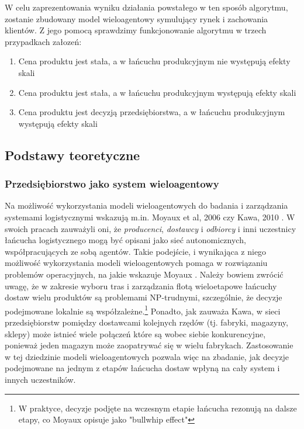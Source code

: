 \documentclass{article}
\begin{document}
W celu zaprezentowania wyniku działania powstałego w ten sposób algorytmu, zostanie zbudowany model wieloagentowy symulujący rynek i zachowania klientów. Z jego pomocą sprawdzimy funkcjonowanie algorytmu w trzech przypadkach załozeń: 

\begin{enumerate} 
	\item Cena produktu jest stała, a w łańcuchu produkcyjnym nie występują efekty skali 
	\item Cena produktu jest stała, a w łańcuchu produkcyjnym występują efekty skali
	\item Cena produktu jest decyzją przedsiębiorstwa, a w łańcuchu produkcyjnym występują efekty skali
\end{enumerate}


\subsection{Podstawy teoretyczne}
\subsubsection{Przedsiębiorstwo jako system wieloagentowy} 
Na możliwość wykorzystania modeli wieloagentowych do badania i zarządzania systemami logistycznymi wskazują m.in. Moyaux et al, 2006 \cite{Moyaux2006}  czy Kawa, 2010 \cite{Kawa2010}. W swoich pracach zauważyli oni, że  \textit{producenci},  \textit{dostawcy} i  \textit{odbiorcy} i inni uczestnicy łańcucha logistycznego mogą być opisani jako sieć autonomicznych, współpracujących ze sobą agentów. Takie podejście, i wynikająca z niego możliwość wykorzystania modeli wieloagentowych pomaga w rozwiązaniu problemów operacyjnych, na jakie wskazuje Moyaux \cite{Moyaux2006}. Należy bowiem zwrócić uwagę, że w zakresie wyboru tras i zarządzania flotą wieloetapowe łańcuchy dostaw wielu produktów są problemami NP-trudnymi, szczególnie, że decyzje podejmowane lokalnie są współzależne.\footnote{W praktyce, decyzje podjęte na wczesnym etapie łańcucha rezonują na dalsze etapy, co Moyaux opisuje jako "bullwhip effect"} Ponadto, jak zauważa Kawa, w sieci przedsiębiorstw pomiędzy dostawcami kolejnych rzędów (tj. fabryki, magazyny, sklepy) może istnieć wiele połączeń które są wobec siebie konkurencyjne, ponieważ jeden magazyn może zaopatrywać się w wielu fabrykach. Zastosowanie w tej dziedzinie modeli wieloagentowych pozwala więc na zbadanie, jak decyzje podejmowane na jednym z etapów łańcucha dostaw wpłyną na cały system i innych uczestników.  
\end{document}
